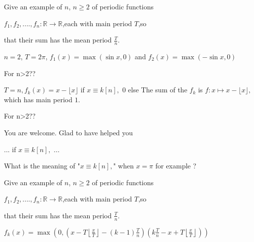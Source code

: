 \begin{solution}
	\begin{tcolorbox}Give an example of $n$, $n\geq2$ of periodic functions

$f_{1},f_{2},....,f_{n}:\mathbb{R}$$\rightarrow\mathbb{R}$,each
with main period $T$,so 

that their sum has the mean period $\frac{T}{n}.$\end{tcolorbox}

$n=2$, $T=2\pi$, $f_1(x)=\max(\sin x,0)$ and $f_2(x)=\max(-\sin x,0)$

\end{solution}



\begin{solution}
	For n>2??
\end{solution}



\begin{solution}
	$T=n,f_k(x)=x-\lfloor x\rfloor$ if $x\equiv k[n],$ $0$ else
The sum of the $f_k$ is $f:x\mapsto x-\lfloor x\rfloor,$ which has main period $1.$
\end{solution}



\begin{solution}
	\begin{tcolorbox}For n>2??\end{tcolorbox}
You are welcome.
Glad to have helped you

\end{solution}



\begin{solution}
	\begin{tcolorbox}... if $x\equiv k[n],$ ...\end{tcolorbox}
What is the meaning of "$x\equiv k[n],$" when $x=\pi$ for example ?


\end{solution}



\begin{solution}
	\begin{tcolorbox}Give an example of $n$, $n\geq2$ of periodic functions

$f_{1},f_{2},....,f_{n}:\mathbb{R}$$\rightarrow\mathbb{R}$,each
with main period $T$,so 

that their sum has the mean period $\frac{T}{n}.$\end{tcolorbox}

$f_k(x)=\max(0,(x-T\left\lfloor\frac xT\right\rfloor-(k-1)\frac Tn)(k\frac Tn-x+T\left\lfloor\frac xT\right\rfloor))$
\end{solution}



